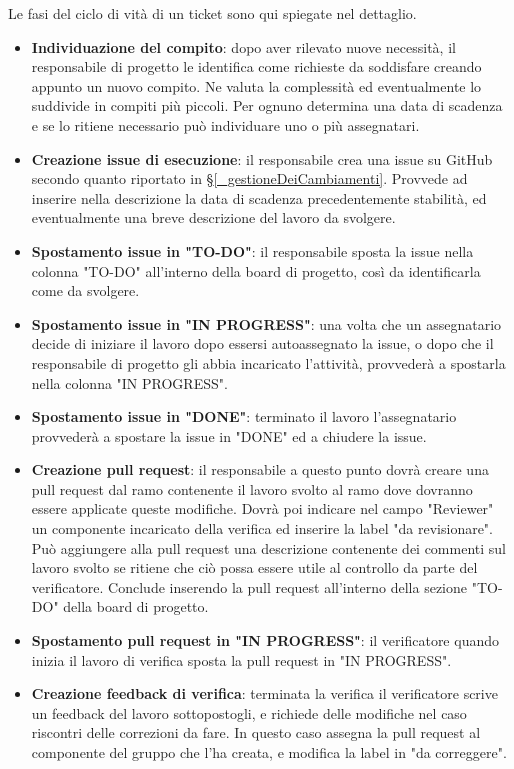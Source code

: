 Le fasi del ciclo di vità di un ticket sono qui spiegate nel dettaglio.
\begin{itemize}
    \item \textbf{Individuazione del compito}: dopo aver rilevato nuove necessità, il responsabile di progetto le identifica come richieste da soddisfare creando appunto un nuovo compito. Ne valuta la complessità ed eventualmente lo suddivide in compiti più piccoli. Per ognuno determina una data di scadenza e se lo ritiene necessario può individuare uno o più assegnatari.
    \item \textbf{Creazione issue di esecuzione}: il responsabile crea una issue su GitHub secondo quanto riportato in \S\ref{_gestioneDeiCambiamenti}. Provvede ad inserire nella descrizione la data di scadenza precedentemente stabilità, ed eventualmente una breve descrizione del lavoro da svolgere.
    \item \textbf{Spostamento issue in "TO-DO"}: il responsabile sposta la issue nella colonna "TO-DO" all'interno della board di progetto, così da identificarla come da svolgere.
    \item \textbf{Spostamento issue in "IN PROGRESS"}: una volta che un assegnatario decide di iniziare il lavoro dopo essersi autoassegnato la issue, o dopo che il responsabile di progetto gli abbia incaricato l'attività, provvederà a spostarla nella colonna "IN PROGRESS".
    \item \textbf{Spostamento issue in "DONE"}: terminato il lavoro l'assegnatario provvederà a spostare la issue in "DONE" ed a chiudere la issue.
    \item \textbf{Creazione pull request}: il responsabile a questo punto dovrà creare una pull request dal ramo contenente il lavoro svolto al ramo dove dovranno essere applicate queste modifiche. Dovrà poi indicare nel campo "Reviewer" un componente incaricato della verifica ed inserire la label "da revisionare". Può aggiungere alla pull request una descrizione contenente dei commenti sul lavoro svolto se ritiene che ciò possa essere utile al controllo da parte del verificatore. Conclude inserendo la pull request all'interno della sezione "TO-DO" della board di progetto.
    \item \textbf{Spostamento pull request in "IN PROGRESS"}: il verificatore quando inizia il lavoro di verifica sposta la pull request in "IN PROGRESS".
    \item \textbf{Creazione feedback di verifica}: terminata la verifica il verificatore scrive un feedback del lavoro sottopostogli, e richiede delle modifiche nel caso riscontri delle correzioni da fare. In questo caso assegna la pull request al componente del gruppo che l'ha creata, e modifica la label in "da correggere".

\end{itemize}
